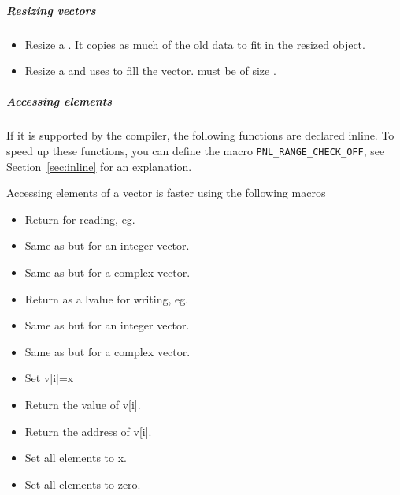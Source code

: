 \subparagraph{Resizing vectors}
\begin{itemize}
\item {}
  \sshortdescribe Resize a \PnlVect. It copies as much of the old
  data to fit in the resized object.
\item {} 
  \sshortdescribe Resize a \PnlVect and uses  to fill the
  vector.  must be of size .
\end{itemize}  

\subparagraph{Accessing elements}

If it is supported by the compiler, the following functions are declared
inline. To speed up these functions, you can define the macro 
\texttt{PNL_RANGE_CHECK_OFF}, see Section~\ref{sec:inline} for an explanation. 

Accessing elements of a vector is faster using the following macros
\begin{itemize}
\item {}
  \sshortdescribe Return  for reading, eg. 
\item {}
  \sshortdescribe Same as  but for an integer vector.
\item {}
  \sshortdescribe Same as  but for a complex vector.
\item {}
  \sshortdescribe Return  as a lvalue for writing, eg.
\item {}
  \sshortdescribe Same as  but for an integer vector.
\item {}
  \sshortdescribe Same as  but for a complex vector.
\end{itemize}

\begin{itemize}
\item {}
  \sshortdescribe Set v[i]=x  
\item {}
  \sshortdescribe Return the value of v[i].  
\item {}
  \sshortdescribe Return the address of v[i].  
\item {}
  \sshortdescribe Set all elements to x.  
\item {}
  \sshortdescribe Set all elements to zero.  
\end{itemize}


